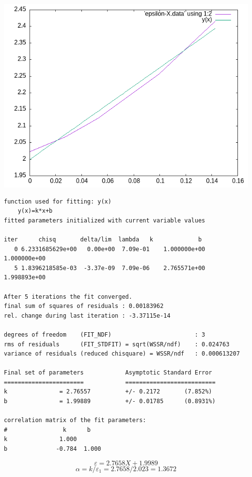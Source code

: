 \documentclass[11pt]{report}
\begin{document}
\begin{center}
\includegraphics[width=.9\linewidth]{../data/epsilon-X.png}
\end{center}

\begin{verbatim}
function used for fitting: y(x)
	y(x)=k*x+b
fitted parameters initialized with current variable values

iter      chisq       delta/lim  lambda   k             b            
   0 6.2331685629e+00   0.00e+00  7.09e-01    1.000000e+00   1.000000e+00
   5 1.8396218585e-03  -3.37e-09  7.09e-06    2.765571e+00   1.998893e+00

After 5 iterations the fit converged.
final sum of squares of residuals : 0.00183962
rel. change during last iteration : -3.37115e-14

degrees of freedom    (FIT_NDF)                        : 3
rms of residuals      (FIT_STDFIT) = sqrt(WSSR/ndf)    : 0.024763
variance of residuals (reduced chisquare) = WSSR/ndf   : 0.000613207

Final set of parameters            Asymptotic Standard Error
=======================            ==========================
k               = 2.76557          +/- 0.2172       (7.852%)
b               = 1.99889          +/- 0.01785      (0.8931%)

correlation matrix of the fit parameters:
#                k      b      
k               1.000 
b              -0.784  1.000 

\end{verbatim}

\[
\varepsilon = 2.7658X+1.9989
\]
\[
\alpha=k/\varepsilon_{1}=2.7658/2.023=1.3672
\]
\end{document}
